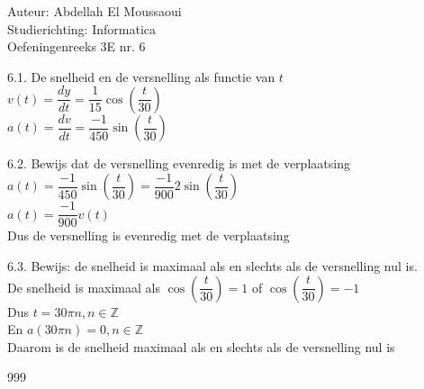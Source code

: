\documentclass[a4paper]{article}
\begin{document}
  
\noindent \large Auteur: Abdellah El Moussaoui \\
\noindent \large Studierichting: Informatica\\
\noindent \large Oefeningenreeks 3E nr. 6\\

\medskip

\normalsize

6.1. De snelheid en de versnelling als functie van $t$ \\

$v\left(t\right) = \dfrac{dy}{dt} = \dfrac{1}{15}\cos\left(\dfrac{t}{30}\right)$\\

$a\left(t\right) = \dfrac{dv}{dt} = \dfrac{-1}{450}\sin\left(\dfrac{t}{30}\right)$\\

\medskip

6.2. Bewijs dat de versnelling evenredig is met de verplaatsing \\

$a\left(t\right) = \dfrac{-1}{450}\sin\left(\dfrac{t}{30}\right) = \dfrac{-1}{900}2\sin\left(\dfrac{t}{30}\right) $\\

$a\left(t\right) = \dfrac{-1}{900}v\left(t\right) $\\

Dus de versnelling is evenredig met de verplaatsing\\

\medskip

6.3. Bewijs: de snelheid is maximaal als en slechts als de versnelling nul is.\\

De snelheid is maximaal als $\cos\left(\dfrac{t}{30}\right) = 1$ of $\cos\left(\dfrac{t}{30}\right) = -1$ \\

Dus $t = 30\pi n, n\in \mathbb{Z}$\\

En $a\left(30\pi n\right) = 0, n\in \mathbb{Z}$ \\

Daarom is de snelheid  maximaal als en slechts als de versnelling nul is\\

\begin{thebibliography}{999}
\end{thebibliography}
\end{document}
